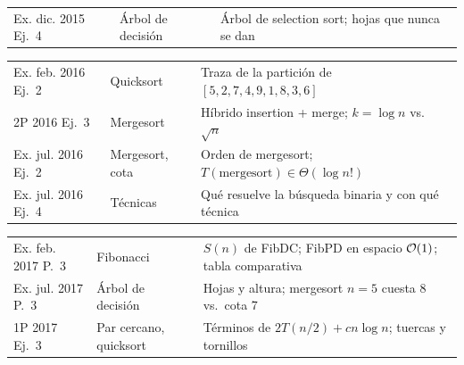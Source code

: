 {\begin{tabularx}{\textwidth}{@{}>{\raggedright\arraybackslash}p{2.95cm}>{\raggedright\arraybackslash}p{2.75cm}>{\raggedright\arraybackslash}X@{}}
Ex. dic. 2015 Ej.~4 & Árbol de decisión & Árbol de selection sort; hojas que nunca se dan \\
\end{tabularx}\par\vspace{-\parskip}
\begin{tabularx}{\textwidth}{@{}>{\raggedright\arraybackslash}p{2.95cm}>{\raggedright\arraybackslash}p{2.75cm}>{\raggedright\arraybackslash}X@{}}
Ex. feb. 2016 Ej.~2 & Quicksort & Traza de la partición de $[5,2,7,4,9,1,8,3,6]$ \\
2P 2016 Ej.~3 & Mergesort & Híbrido insertion + merge; $k=\log n$ vs.\ $\sqrt n$ \\
Ex. jul. 2016 Ej.~2 & Mergesort, cota & Orden de mergesort; $T(\text{mergesort})\in\Theta(\log n!)$ \\
Ex. jul. 2016 Ej.~4 & Técnicas & Qué resuelve la búsqueda binaria y con qué técnica \\
\end{tabularx}\par\vspace{-\parskip}
\begin{tabularx}{\textwidth}{@{}>{\raggedright\arraybackslash}p{2.95cm}>{\raggedright\arraybackslash}p{2.75cm}>{\raggedright\arraybackslash}X@{}}
Ex. feb. 2017 P.~3 & Fibonacci & $S(n)$ de FibDC; FibPD en espacio $\mathcal{O}(1)$; tabla comparativa \\
Ex. jul. 2017 P.~3 & Árbol de decisión & Hojas y altura; mergesort $n=5$ cuesta 8 vs.\ cota 7 \\
1P 2017 Ej.~3 & Par cercano, quicksort & Términos de $2T(n/2)+cn\log n$; tuercas y tornillos \\
\bottomrule
\end{tabularx}

}
